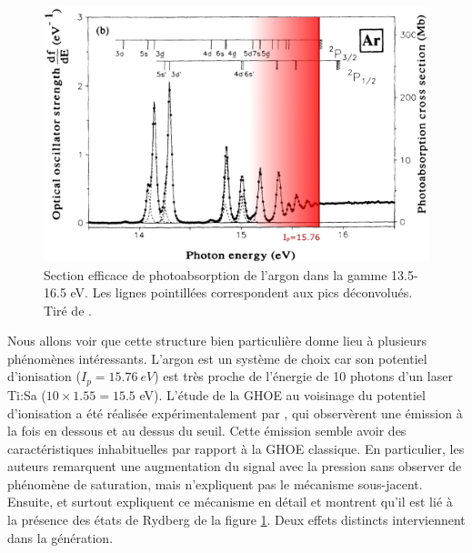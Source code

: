 \begin{figure}[!ht]
\centering
\includegraphics[width=0.9\columnwidth]{Figures/ResonantArgon/argon_spectrum.png}%
\caption{Section efficace de photoabsorption de l'argon dans la gamme 13.5-16.5 eV. Les lignes pointillées correspondent aux pics déconvolués. Tiré de .}
\label{fig:ArIp}%
\end{figure}

Nous allons voir que cette structure bien particulière donne lieu à plusieurs phénomènes intéressants. L'argon est un système de choix car son potentiel d'ionisation ($I_p = \SI{15.76}{eV}$) est très proche de l'énergie de 10 photons d'un laser Ti:Sa ($10\times 1.55 = 15.5$ eV). L'étude de la GHOE au voisinage du potentiel d'ionisation a été réalisée expérimentalement par , qui observèrent une émission à la fois en dessous et au dessus du seuil. Cette émission semble avoir des caractéristiques inhabituelles par rapport à la GHOE classique. En particulier, les auteurs remarquent une augmentation du signal avec la pression sans observer de phénomène de saturation, mais n'expliquent pas le mécanisme sous-jacent. Ensuite,  et surtout  expliquent ce mécanisme en détail et montrent qu'il est lié à la présence des états de Rydberg de la figure \ref{fig:ArIp}. Deux effets distincts interviennent dans la génération.

